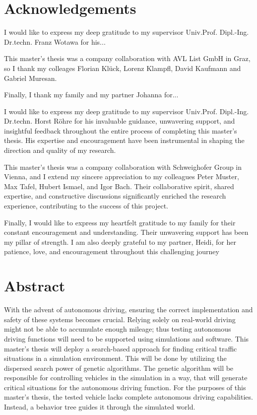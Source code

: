 \chapter*{Acknowledgements}
\label{chap:acknowledgements}

I would like to express my deep gratitude to my supervisor Univ.Prof. Dipl.-Ing. Dr.techn. Franz Wotawa for his...

This master's thesis was a company collaboration with AVL List GmbH in Graz, so I thank my colleages Florian Klück, Lorenz Klampfl, David Kaufmann and Gabriel Muresan.

Finally, I thank my family and my partner Johanna for...




I would like to express my deep gratitude to my supervisor Univ.Prof. Dipl.-Ing. Dr.techn. Horst Röhre for his invaluable guidance, unwavering support, and insightful feedback throughout the entire process of completing this master's thesis. His expertise and encouragement have been instrumental in shaping the direction and quality of my research.

This master's thesis was a company collaboration with Schweighofer Group in Vienna, and I extend my sincere appreciation to my colleagues Peter Muster, Max Tafel, Hubert Ismael, and Igor Bach. Their collaborative spirit, shared expertise, and constructive discussions significantly enriched the research experience, contributing to the success of this project.

Finally, I would like to express my heartfelt gratitude to my family for their constant encouragement and understanding. Their unwavering support has been my pillar of strength. I am also deeply grateful to my partner, Heidi, for her patience, love, and encouragement throughout this challenging journey

\chapter*{Abstract}
\label{chap:abstract}

With the advent of autonomous driving, ensuring the correct implementation and safety of these systems becomes crucial. Relying solely on real-world driving might not be able to accumulate enough mileage; thus testing autonomous driving functions will need to be supported using simulations and software. This master's thesis will deploy a search-based approach for finding critical traffic situations in a simulation environment. This will be done by utilizing the dispersed search power of genetic algorithms. The genetic algorithm will be responsible for controlling vehicles in the simulation in a way, that will generate critical situations for the autonomous driving function. For the purposes of this master's thesis, the tested vehicle lacks complete autonomous driving capabilities. Instead, a behavior tree guides it through the simulated world.

